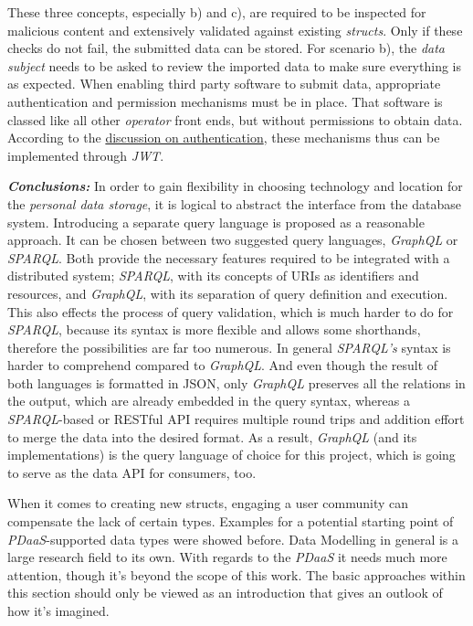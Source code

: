 \documentclass[12pt,english,a4paper,titlepage,cleardoublepage=empty,dottedtoc]{report}
\begin{document}
These three concepts, especially b) and c), are required to be inspected
for malicious content and extensively validated against existing
\emph{structs}. Only if these checks do not fail, the submitted data can
be stored. For scenario b), the \emph{data subject} needs to be asked to
review the imported data to make sure everything is as expected. When
enabling third party software to submit data, appropriate authentication
and permission mechanisms must be in place. That software is classed
like all other \emph{operator} front ends, but without permissions to
obtain data. According to the
\protect\hyperlink{authentication}{discussion on authentication}, these
mechanisms thus can be implemented through \emph{JWT}.

\emph{\textbf{Conclusions:}} In order to gain flexibility in choosing
technology and location for the \emph{personal data storage}, it is
logical to abstract the interface from the database system. Introducing
a separate query language is proposed as a reasonable approach. It can
be chosen between two suggested query languages, \emph{GraphQL} or
\emph{SPARQL}. Both provide the necessary features required to be
integrated with a distributed system; \emph{SPARQL}, with its concepts
of URIs as identifiers and resources, and \emph{GraphQL}, with its
separation of query definition and execution. This also effects the
process of query validation, which is much harder to do for
\emph{SPARQL}, because its syntax is more flexible and allows some
shorthands, therefore the possibilities are far too numerous. In general
\emph{SPARQL's} syntax is harder to comprehend compared to
\emph{GraphQL}. And even though the result of both languages is
formatted in JSON, only \emph{GraphQL} preserves all the relations in
the output, which are already embedded in the query syntax, whereas a
\emph{SPARQL}-based or RESTful API requires multiple round trips and
addition effort to merge the data into the desired format. As a result,
\emph{GraphQL} (and its implementations) is the query language of choice
for this project, which is going to serve as the data API for consumers,
too.

When it comes to creating new structs, engaging a user community can
compensate the lack of certain types. Examples for a potential starting
point of \emph{PDaaS}-supported data types were showed before. Data
Modelling in general is a large research field to its own. With regards
to the \emph{PDaaS} it needs much more attention, though it's beyond the
scope of this work. The basic approaches within this section should only
be viewed as an introduction that gives an outlook of how it's imagined.
\end{document}

